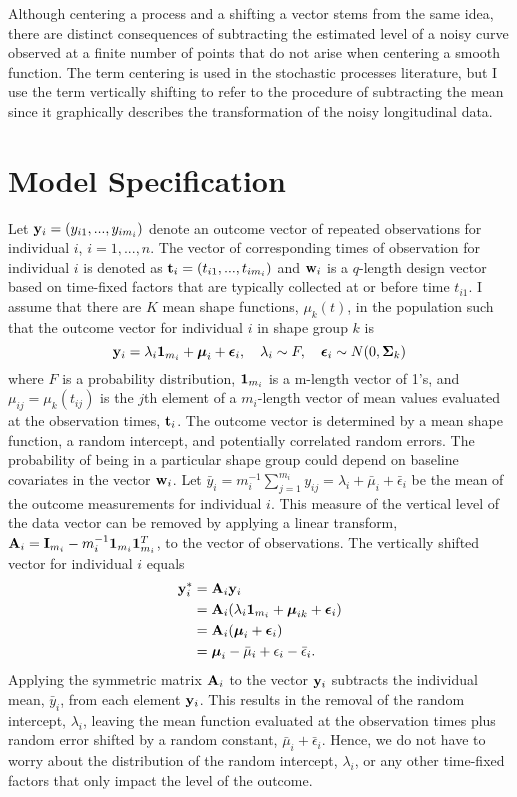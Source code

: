  Although centering a process and a shifting a vector stems from the same idea, there are distinct consequences of subtracting the estimated level of a noisy curve observed at a finite number of points that do not arise when centering a smooth function. The term centering is used in the stochastic processes literature, but I use the term vertically shifting to refer to the procedure of subtracting the mean since it graphically describes the transformation of the noisy longitudinal data.

\section{Model Specification}
 Let $\mathbf y_{i}=(y_{i1},...,y_{im_{i}})$ denote an outcome vector of repeated observations for individual $i$, $i=1,...,n$. The vector of corresponding times of observation for individual $i$ is denoted as $\mathbf t_{i}=(t_{i1},...,t_{im_{i}})$ and $\mathbf w_{i}$ is a $q$-length design vector based on time-fixed factors that are typically collected at or before time $t_{i1}$. I assume that there are $K$ mean shape functions, $\mu_{k}(t)$, in the population such that the outcome vector for individual $i$ in shape group $k$ is
 $$\mathbf y_{i} = \lambda_{i}\mathbf 1_{m_{i}}+\boldsymbol\mu_{i}+\boldsymbol\epsilon_{i},\quad \lambda_{i}\sim F, \quad \boldsymbol\epsilon_{i}\sim N(0,\boldsymbol\Sigma_{k})$$
 where $F$ is a probability distribution, $\mathbf 1_{m_{i}}$ is a m-length vector of 1's, and $\mu_{ij} = \mu_{k}(t_{ij})$ is the $j$th element of a $m_{i}$-length vector of mean values evaluated at the observation times, $\mathbf t_{i}$. The outcome vector is determined by a mean shape function, a random intercept, and potentially correlated random errors. The probability of being in a particular shape group could depend on baseline covariates in the vector $\mathbf w_{i}$. Let $\bar{y}_{i}= m_{i}^{-1}\sum^{m_{i}}_{j=1} y_{ij} = \lambda_{i}+\bar{\mu}_{i}+\bar{\epsilon}_{i}$ be the mean of the outcome measurements for individual $i$. This measure of the vertical level of the data vector can be removed by applying a linear transform, $\mathbf A_{i} = \mathbf I_{m_{i}} - m_{i}^{-1}\mathbf 1_{m_{i}}\mathbf 1_{m_{i}}^{T}$, to the vector of observations. The vertically shifted vector for individual $i$ equals 
\begin{align*}
\mathbf y^{*}_{i} &= \mathbf A_{i}\mathbf y_{i}\\
&=\mathbf A_{i}(\lambda_{i}\mathbf 1_{m_{i}}+\boldsymbol\mu_{ik}+\boldsymbol\epsilon_{i})\\
&=\mathbf A_{i}(\boldsymbol\mu_{i}+\boldsymbol\epsilon_{i})\\
&=\boldsymbol\mu_{i} - \bar{\mu}_{i}+\epsilon_{i}-\bar{\epsilon}_{i}.
\end{align*}
Applying the symmetric matrix $\mathbf A_{i}$ to the vector $\mathbf y_{i}$ subtracts the individual mean, $\bar{y}_{i}$, from each element $\mathbf y_{i}$. This results in the removal of the random intercept, $\lambda_{i}$, leaving the mean function evaluated at the observation times plus random error shifted by a random constant, $\bar{\mu}_{i}+\bar{\epsilon}_{i}$. Hence, we do not have to worry about the distribution of the random intercept, $\lambda_{i}$, or any other time-fixed factors that only impact the level of the outcome. 

